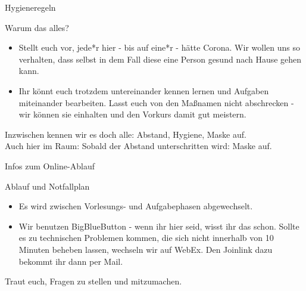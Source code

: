 \begin{frame}[fragile]{Hygieneregeln}
	\begin{alertblock}{Warum das alles?}
		\begin{itemize}
			\item Stellt euch vor, jede*r hier - bis auf eine*r - hätte Corona. Wir wollen uns so verhalten, dass selbst in dem Fall diese eine Person gesund nach Hause gehen kann.
			\item Ihr könnt euch trotzdem untereinander kennen lernen und Aufgaben miteinander bearbeiten. Lasst euch von den Maßnamen nicht abschrecken - wir können sie einhalten und den Vorkurs damit gut meistern.
		\end{itemize}
	\alert{Inzwischen kennen wir es doch alle: Abstand, Hygiene, Maske auf.\\
	Auch hier im Raum: Sobald der Abstand unterschritten wird: Maske auf.}
	\end{alertblock}
\end{frame}

\begin{frame}[fragile]{Infos zum Online-Ablauf}
	\begin{alertblock}{Ablauf und Notfallplan}
		\begin{itemize}
			\item Es wird zwischen Vorlesungs- und Aufgabephasen abgewechselt.
			\item Wir benutzen BigBlueButton - wenn ihr hier seid, wisst ihr das schon. Sollte es zu technischen Problemen kommen, die sich nicht innerhalb von 10 Minuten beheben lassen, wechseln wir auf WebEx. Den Joinlink dazu bekommt ihr dann per Mail.
		\end{itemize}
		\alert{Traut euch, Fragen zu stellen und mitzumachen.}
	\end{alertblock}
\end{frame}
